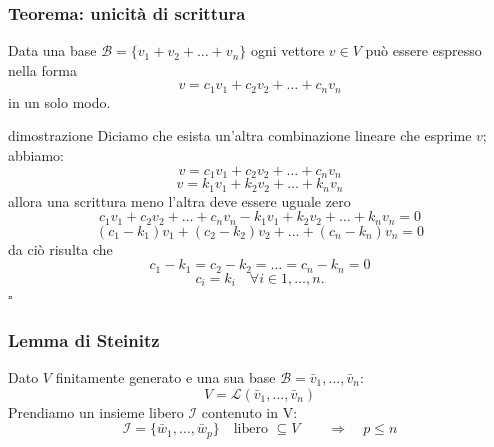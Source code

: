 \documentclass[x11names]{article}
\newcommand*{\QEDB}{\null\nobreak\hfill\ensuremath{\square}}%
\begin{document}
\begin{center}
	\colorbox{myred}{\begin{minipage}{5.75in}
			\begin{redes}{}
				\subsubsection{Teorema: unicità di scrittura}
				Data una base $\mathscr{B} = \{v_1 + v_2 + \dots + v_{n}\}$ ogni vettore $v \in V$ può essere espresso nella forma
				\[
				v = c_1v_1 + c_2v_2 + \dots + c_{n}v_{n}
				\]
				in un solo modo.
			\end{redes}
	\end{minipage}}        
\end{center}



\begin{es}{dimostrazione}
Diciamo che esista un'altra combinazione lineare che esprime $v$; abbiamo:
\[
v = c_1v_1 + c_2v_2 + \dots + c_{n}v_{n}
\]
\[
v = k_1v_1 + k_2v_2 + \dots + k_{n}v_{n}
\]
allora una scrittura meno l'altra deve essere uguale zero
\[
c_1v_1 + c_2v_2 + \dots + c_{n}v_{n} - k_1v_1 + k_2v_2 + \dots + k_{n}v_{n} = 0
\] 
\[
	\left(c_1-k_1\right)v_1 + \left(c_2-k_2\right)v_2 + \dots + \left(c_{n} - k_{n}\right)v_{n} = 0
\] 
da ciò risulta che
\[
c_1 - k_1 = c_2 - k_2 = \dots = c_{n} -k_{n} = 0
\] 
\[
c_i = k_{i} \quad \forall i \in {1,\dots,n}
.\] \QEDB
\end{es}


\subsubsection{Lemma di Steinitz}
				Dato $V$ finitamente generato e una sua base $\mathcal{B} = {\bar{v}_{1},\dots,\bar{v}_{n}}$:
				\[
				V = \mathcal{L}(\bar{v}_{1},\dots,\bar{v}_{n}) 
				\]
				Prendiamo un insieme libero $\mathcal{I}$ contenuto in V:
				\[
				\mathcal{I} = \{\bar{w}_{1},\dots,\bar{w}_{p}\} \quad \text{libero } \subseteq V \quad  \quad \Longrightarrow \quad p \leq n
				\]
\end{document}
